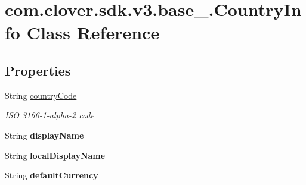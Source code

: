 \hypertarget{classcom_1_1clover_1_1sdk_1_1v3_1_1base___1_1_country_info}{}\section{com.\+clover.\+sdk.\+v3.\+base\+\_\+.\+Country\+Info Class Reference}
\label{classcom_1_1clover_1_1sdk_1_1v3_1_1base___1_1_country_info}
\subsection*{Properties}
\begin{DoxyCompactItemize}
\item 
String \hyperlink{classcom_1_1clover_1_1sdk_1_1v3_1_1base___1_1_country_info_aaa35e971abab07f0f55c126a0c4a8796}{country\+Code}
\begin{DoxyCompactList}\small\item\em I\+SO 3166-\/1-\/alpha-\/2 code \end{DoxyCompactList}\item 
\mbox{\label{classcom_1_1clover_1_1sdk_1_1v3_1_1base___1_1_country_info_ad49a5e30ea3395bd3f108d83deb96b20}} 
String {\bfseries display\+Name}
\item 
\mbox{\label{classcom_1_1clover_1_1sdk_1_1v3_1_1base___1_1_country_info_a9704e4b085dbb521eeb7094fc73e8ec5}} 
String {\bfseries local\+Display\+Name}
\item 
\mbox{\label{classcom_1_1clover_1_1sdk_1_1v3_1_1base___1_1_country_info_a6c014d87ba754ae72e4ad5b23bbddf1b}} 
String {\bfseries default\+Currency}
\item 
\mbox{\label{classcom_1_1clover_1_1sdk_1_1v3_1_1base___1_1_country_info_a4a373f1bc6b5e82df037d353010b9cda}} 

\end{DoxyCompactItemize}

